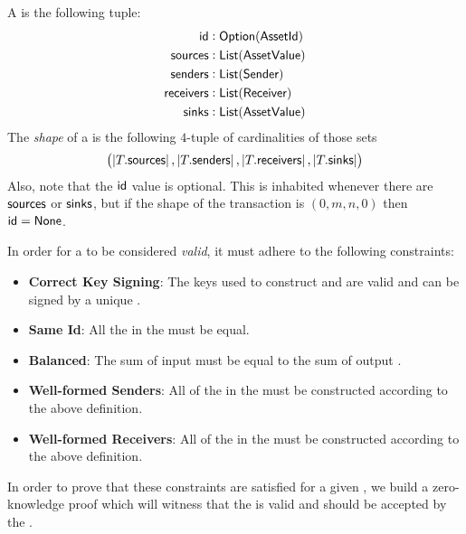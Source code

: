 \begin{definition}
    A \Transfer{} is the following tuple:
    \begin{align*}
        {\textsf{id}}        &: {\textsf{Option}}({\textsf{AssetId}}) \\
        {\textsf{sources}}   &: {\textsf{List}}({\textsf{AssetValue}}) \\
        {\textsf{senders}}   &: {\textsf{List}}({\textsf{Sender}}) \\
        {\textsf{receivers}} &: {\textsf{List}}({\textsf{Receiver}}) \\
        {\textsf{sinks}}     &: {\textsf{List}}({\textsf{AssetValue}})
    \end{align*}
    The \emph{shape} of a \Transfer{} is the following $4$-tuple of cardinalities of those sets
    \[\left(\left|T.{\textsf{sources}}\right|, \left|T.{\textsf{senders}}\right|, \left|T.{\textsf{receivers}}\right|, \left|T.{\textsf{sinks}}\right|\right)\]
    Also, note that the ${\textsf{id}}$ value is optional. This is inhabited whenever there are ${\textsf{sources}}$ or ${\textsf{sinks}}$, but if the shape of the transaction is $(0, m, n, 0)$ then ${\textsf{id}} = {\textsf{None}}$.
\end{definition}

In order for a \Transfer{} to be considered \emph{valid}, it must adhere to the following constraints:

\begin{itemize}
    \item \textbf{Correct Key Signing}: The keys used to construct  and  are valid and can be signed by a unique \SpendingKey{}.
    \item \textbf{Same Id}: All the  in the \Transfer{} must be equal.
    \item \textbf{Balanced}: The sum of input  must be equal to the sum of output .
    \item \textbf{Well-formed Senders}: All of the  in the \Transfer{} must be constructed according to the above \Sender{} definition.
    \item \textbf{Well-formed Receivers}: All of the  in the \Transfer{} must be constructed according to the above \Receiver{} definition.
\end{itemize}

In order to prove that these constraints are satisfied for a given \Transfer{}, we build a zero-knowledge proof which will witness that the \Transfer{} is valid and should be accepted by the \Ledger{}.

